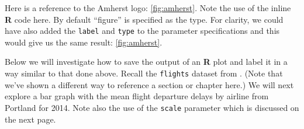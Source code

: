 \documentclass[12pt,twoside]{amherstthesis}
\begin{document}
  Here is a reference to the Amherst logo: \autoref{fig:amherst}. Note the
  use of the inline \textbf{R} code here. By default ``figure'' is
  specified as the type. For clarity, we could have also added the
  \texttt{label} and \texttt{type} to the parameter specifications and
  this would give us the same result: \autoref{fig:amherst}.
  
  \clearpage 
  
  Below we will investigate how to save the output of an \textbf{R} plot
  and label it in a way similar to that done above. Recall the
  \texttt{flights} dataset from \protect\hyperlink{rmd-basics}{}. (Note
  that we've shown a different way to reference a section or chapter
  here.) We will next explore a bar graph with the mean flight departure
  delays by airline from Portland for 2014. Note also the use of the
  \texttt{scale} parameter which is discussed on the next page.
  
  \begin{Shaded}
  \end{Shaded}
  
  \begin{Shaded}
  \begin{Highlighting}[]
  \NormalTok{(} \NormalTok{, }
         \NormalTok{, }
         \NormalTok{, } \NormalTok{,}
         \NormalTok{)}
  \end{Highlighting}
  \end{Shaded}
  
\end{document}
